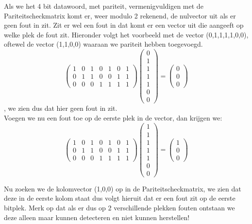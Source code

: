 \documentclass[a4paper]{article}
\begin{document}
Als we het 4 bit datawoord, met pariteit, vermenigvuldigen met de Pariteitscheckmatrix komt er, weer modulo 2 rekenend, de nulvector uit als er geen fout in zit. Zit er wel een fout in dat komt er een vector uit die aangeeft op welke plek de fout zit. Hieronder volgt het voorbeeld met de vector (0,1,1,1,1,0,0), oftewel de vector (1,1,0,0) waaraan we pariteit hebben toegevoegd.
\begin{equation*}
	\begin{pmatrix}
		1&0&1&0&1&0&1 \\
		0&1&1&0&0&1&1 \\
		0&0&0&1&1&1&1
	\end{pmatrix}
	\begin{pmatrix}
		0\\1\\1\\1\\1\\0\\0
	\end{pmatrix}
	=
	\begin{pmatrix}
		0\\0\\0
	\end{pmatrix}
\end{equation*},
we zien dus dat hier geen fout in zit.
\\ Voegen we nu een fout toe op de eerste plek in de vector, dan krijgen we:\\
\begin{equation*}
	\begin{pmatrix}
		1&0&1&0&1&0&1 \\
		0&1&1&0&0&1&1 \\
		0&0&0&1&1&1&1
	\end{pmatrix}
	\begin{pmatrix}
		1\\1\\1\\1\\1\\0\\0
	\end{pmatrix}
	=
	\begin{pmatrix}
		1\\0\\0
	\end{pmatrix}
 \end{equation*}

Nu zoeken we de kolomvector (1,0,0) op in de Pariteitscheckmatrix, we zien dat deze in de eerste kolom staat dus volgt hieruit dat er een fout zit op de eerste bitplek. Merk op dat als er dus op 2 verschillende plekken fouten ontstaan we deze alleen maar kunnen detecteren en niet kunnen herstellen!
\end{document}

